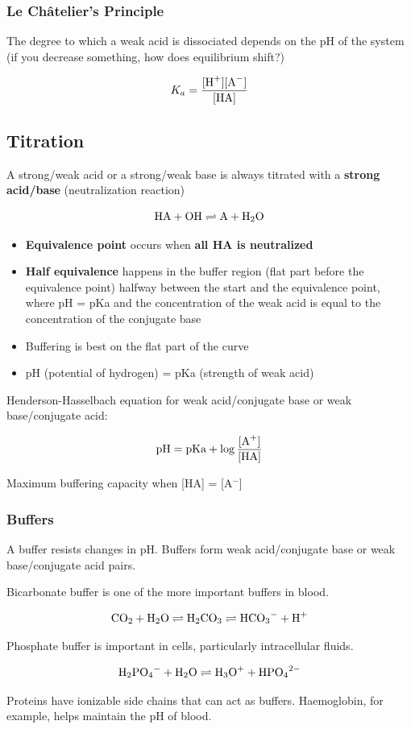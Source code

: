 \documentclass[letterpaper, 12pt]{article}
\begin{document}
\subsubsection*{Le Châtelier's Principle}

The degree to which a weak acid is dissociated depends on the pH of the system (if you decrease something, how does equilibrium shift?)

\begin{equation}
K_a = \frac{[\ce{H+}] [\ce{A-}]} {[\ce{HA}]}
\end{equation}

\subsection*{Titration}

A strong/weak acid or a strong/weak base is always titrated with a \textbf{strong acid/base} (neutralization reaction)

$$ \ce{HA} + \ce{OH} \rightleftharpoons \ce{A} + \ce{H2O} $$

\begin{itemize}
\item \textbf{Equivalence point} occurs when \textbf{all HA is neutralized}

\item \textbf{Half equivalence} happens in the buffer region (flat part before the equivalence point) halfway between the start and the equivalence point, where pH = pKa and the concentration of the weak acid is equal to the concentration of the conjugate base

\item Buffering is best on the flat part of the curve

\item pH (potential of hydrogen) = pKa (strength of weak acid)

\end{itemize}

Henderson-Hasselbach equation for weak acid/conjugate base or weak base/conjugate acid:

\begin{equation}
\text{pH} = \text{pKa} + \log \frac{[\ce{A+}]}{[\ce{HA}]}
\end{equation}

Maximum buffering capacity when [HA] = [A$^-$]

\subsubsection*{Buffers}
A buffer resists changes in pH. Buffers form weak acid/conjugate base or weak base/conjugate acid pairs.

Bicarbonate buffer is one of the more important buffers in blood.

$$\ce{CO2} + \ce{H2O} \rightleftharpoons \ce{H2CO3} \rightleftharpoons \ce{HCO3-} + \ce{H+}$$

Phosphate buffer is important in cells, particularly intracellular fluids.

$$\ce{H2PO4-} + \ce{H2O} \rightleftharpoons \ce{H3O+} + \ce{HPO4^2-}$$

Proteins have ionizable side chains that can act as buffers. Haemoglobin, for example, helps maintain the pH of blood.
\end{document}
